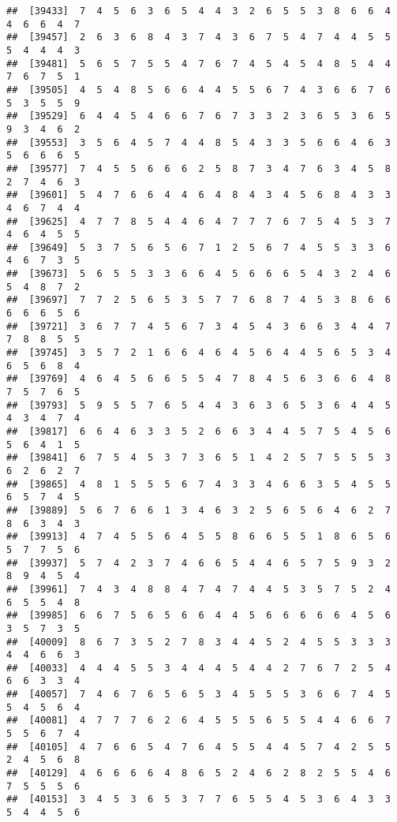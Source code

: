 \documentclass[
]{book}
\begin{document}
\begin{verbatim}
##  [39433]  7  4  5  6  3  6  5  4  4  3  2  6  5  5  3  8  6  6  4  4  6  6  4  7
##  [39457]  2  6  3  6  8  4  3  7  4  3  6  7  5  4  7  4  4  5  5  5  4  4  4  3
##  [39481]  5  6  5  7  5  5  4  7  6  7  4  5  4  5  4  8  5  4  4  7  6  7  5  1
##  [39505]  4  5  4  8  5  6  6  4  4  5  5  6  7  4  3  6  6  7  6  5  3  5  5  9
##  [39529]  6  4  4  5  4  6  6  7  6  7  3  3  2  3  6  5  3  6  5  9  3  4  6  2
##  [39553]  3  5  6  4  5  7  4  4  8  5  4  3  3  5  6  6  4  6  3  5  6  6  6  5
##  [39577]  7  4  5  5  6  6  6  2  5  8  7  3  4  7  6  3  4  5  8  2  7  4  6  3
##  [39601]  5  4  7  6  6  4  4  6  4  8  4  3  4  5  6  8  4  3  3  4  6  7  4  4
##  [39625]  4  7  7  8  5  4  4  6  4  7  7  7  6  7  5  4  5  3  7  4  6  4  5  5
##  [39649]  5  3  7  5  6  5  6  7  1  2  5  6  7  4  5  5  3  3  6  4  6  7  3  5
##  [39673]  5  6  5  5  3  3  6  6  4  5  6  6  6  5  4  3  2  4  6  5  4  8  7  2
##  [39697]  7  7  2  5  6  5  3  5  7  7  6  8  7  4  5  3  8  6  6  6  6  6  5  6
##  [39721]  3  6  7  7  4  5  6  7  3  4  5  4  3  6  6  3  4  4  7  7  8  8  5  5
##  [39745]  3  5  7  2  1  6  6  4  6  4  5  6  4  4  5  6  5  3  4  6  5  6  8  4
##  [39769]  4  6  4  5  6  6  5  5  4  7  8  4  5  6  3  6  6  4  8  7  5  7  6  5
##  [39793]  5  9  5  5  7  6  5  4  4  3  6  3  6  5  3  6  4  4  5  4  3  4  7  4
##  [39817]  6  6  4  6  3  3  5  2  6  6  3  4  4  5  7  5  4  5  6  5  6  4  1  5
##  [39841]  6  7  5  4  5  3  7  3  6  5  1  4  2  5  7  5  5  5  3  6  2  6  2  7
##  [39865]  4  8  1  5  5  5  6  7  4  3  3  4  6  6  3  5  4  5  5  6  5  7  4  5
##  [39889]  5  6  7  6  6  1  3  4  6  3  2  5  6  5  6  4  6  2  7  8  6  3  4  3
##  [39913]  4  7  4  5  5  6  4  5  5  8  6  6  5  5  1  8  6  5  6  5  7  7  5  6
##  [39937]  5  7  4  2  3  7  4  6  6  5  4  4  6  5  7  5  9  3  2  8  9  4  5  4
##  [39961]  7  4  3  4  8  8  4  7  4  7  4  4  5  3  5  7  5  2  4  6  5  5  4  8
##  [39985]  6  6  7  5  6  5  6  6  4  4  5  6  6  6  6  6  4  5  6  3  5  7  3  5
##  [40009]  8  6  7  3  5  2  7  8  3  4  4  5  2  4  5  5  3  3  3  4  4  6  6  3
##  [40033]  4  4  4  5  5  3  4  4  4  5  4  4  2  7  6  7  2  5  4  6  6  3  3  4
##  [40057]  7  4  6  7  6  5  6  5  3  4  5  5  5  3  6  6  7  4  5  5  4  5  6  4
##  [40081]  4  7  7  7  6  2  6  4  5  5  5  6  5  5  4  4  6  6  7  5  5  6  7  4
##  [40105]  4  7  6  6  5  4  7  6  4  5  5  4  4  5  7  4  2  5  5  2  4  5  6  8
##  [40129]  4  6  6  6  6  4  8  6  5  2  4  6  2  8  2  5  5  4  6  7  5  5  5  6
##  [40153]  3  4  5  3  6  5  3  7  7  6  5  5  4  5  3  6  4  3  3  5  4  4  5  6

\end{verbatim}
\end{document}
